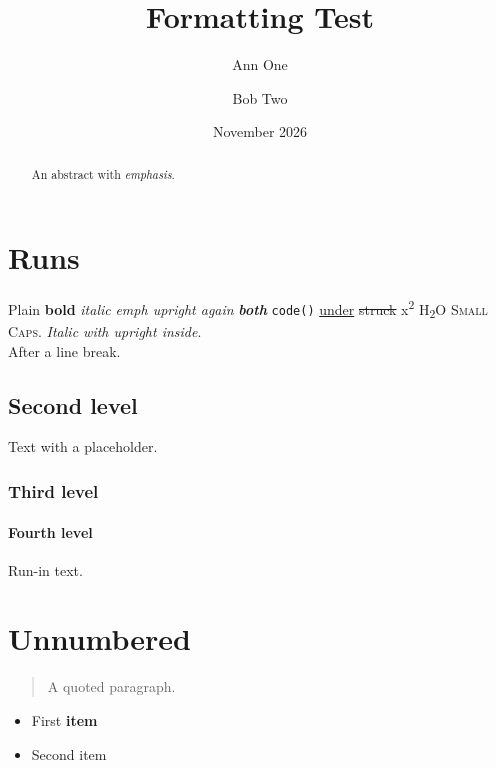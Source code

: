 \documentclass{article}
\title{Formatting Test}
\author{Ann One \and Bob Two}
\date{November 2026}
\begin{document}
\maketitle
\begin{abstract}
An abstract with \emph{emphasis}.
\end{abstract}
\section{Runs}\label{sec:runs}
Plain \textbf{bold} \textit{italic} \emph{emph \emph{upright} again} \textbf{\emph{both}} \texttt{code()} \underline{under} \sout{struck} x\textsuperscript{2} H\textsubscript{2}O \textsc{Small Caps}.
\textit{Italic with \emph{upright} inside}.\\
After a line break.
\subsection{Second level}
Text with a  placeholder.
\subsubsection{Third level}
\paragraph{Fourth level} Run-in text.
\section*{Unnumbered}
\begin{quote}
A quoted paragraph.
\end{quote}
\begin{itemize}
  \item First \textbf{item}
  \item Second item
\end{itemize}
\end{document}
